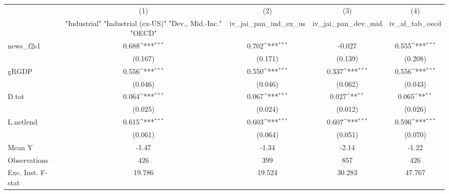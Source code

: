 {
\def\sym#1{\ifmmode^{#1}\else\(^{#1}\)\fi}
\begin{tabular}{l*{4}{c}}
\toprule
            &\multicolumn{1}{c}{(1)}&\multicolumn{1}{c}{(2)}&\multicolumn{1}{c}{(3)}&\multicolumn{1}{c}{(4)}\\
            &\multicolumn{1}{c}{ "Industrial" "Industrial (ex-US)" "Dev., Mid.-Inc." "OECD" }&\multicolumn{1}{c}{iv\_jai\_pan\_ind\_ex\_us}&\multicolumn{1}{c}{iv\_jai\_pan\_dev\_mid}&\multicolumn{1}{c}{iv\_al\_tab\_oecd}\\
\midrule
news\_f2s1   &       0.688\sym{***}&       0.702\sym{***}&      -0.027         &       0.555\sym{***}\\
            &     (0.167)         &     (0.171)         &     (0.139)         &     (0.208)         \\
\addlinespace
gRGDP       &       0.556\sym{***}&       0.550\sym{***}&       0.337\sym{***}&       0.556\sym{***}\\
            &     (0.046)         &     (0.046)         &     (0.062)         &     (0.043)         \\
\addlinespace
D.tot       &       0.064\sym{***}&       0.067\sym{***}&       0.027\sym{**} &       0.065\sym{**} \\
            &     (0.025)         &     (0.024)         &     (0.012)         &     (0.026)         \\
\addlinespace
L.netlend   &       0.615\sym{***}&       0.603\sym{***}&       0.607\sym{***}&       0.596\sym{***}\\
            &     (0.061)         &     (0.064)         &     (0.051)         &     (0.070)         \\
\midrule
Mean Y      &       -1.47         &       -1.34         &       -2.14         &       -1.22         \\
Observations&         426         &         399         &         857         &         426         \\
Exc. Inst. F-stat&      19.786         &      19.524         &      30.283         &      47.767         \\
\bottomrule
\end{tabular}
}
